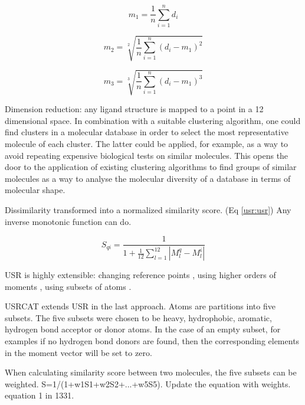 \begin{equation}
m_1=\frac{1}{n}\sum_{i=1}^{n}{d_i}
\label{usr:moment1}
\end{equation}

\begin{equation}
m_2=\sqrt[2]{\frac{1}{n}\sum_{i=1}^{n}{(d_i-m_1)^2}}
\label{usr:moment2}
\end{equation}

\begin{equation}
m_3=\sqrt[3]{\frac{1}{n}\sum_{i=1}^{n}{(d_i-m_1)^3}}
\label{usr:moment3}
\end{equation}

Dimension reduction: any ligand structure is mapped to a point in a 12 dimensional space. In combination with a suitable clustering algorithm, one could find clusters in a molecular database in order to select the most representative molecule of each cluster. The latter could be applied, for example, as a way to avoid repeating expensive biological tests on similar molecules.  This opens the door to the application of existing clustering algorithms to find groups of similar molecules as a way to analyse the molecular diversity of a database in terms of molecular shape. \citep{1280,1332}

Dissimilarity transformed into a normalized similarity score. (Eq \ref{usr:usr}) Any inverse monotonic function can do.

\begin{equation}
S_{qi}=\frac{1}{1+\frac{1}{12}\sum_{l=1}^{12}|M_l^q-M_l^i|}
\label{usr:usr}
\end{equation}

USR is highly extensible: changing reference points \citep{1334,1335}, using higher orders of moments \citep{1333,1337}, using subsets of atoms \citep{1436,1331}.

USRCAT extends USR in the last approach. Atoms are partitions into five subsets. The five subsets were chosen to be heavy, hydrophobic, aromatic, hydrogen bond acceptor or donor atoms.%
In the case of an empty subset, for examples if no hydrogen bond donors are found, then the corresponding elements in the moment vector will be set to zero.

When calculating similarity score between two molecules, the five subsets can be weighted. S=1/(1+w1S1+w2S2+...+w5S5). Update the equation with weights. equation 1 in {1331}.

